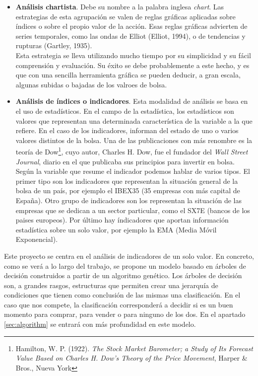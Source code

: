\begin{itemize}
    \item \textbf{An\'alisis chartista}. Debe su nombre a la palabra inglesa \textit{chart}. Las estrategias de esta agrupaci\'on se valen de reglas gr\'aficas aplicadas sobre \'indices o sobre el propio valor de la acci\'on. Esas reglas gr\'aficas advierten de series temporales, como las ondas de Elliot (Elliot, 1994), o de tendencias y rupturas (Gartley, 1935). \\
    
    Esta estrategia se lleva utilizando mucho tiempo por su simplicidad y su f\'acil comprensi\'on y evaluaci\'on.
    Su \'exito se debe probablemente a este hecho, y es que con una sencilla herramienta gr\'afica se pueden deducir, a gran escala, algunas subidas o bajadas de los valroes de bolsa.
    
    \item \textbf{An\'alisis de \'indices o indicadores}. Esta modalidad de an\'alisis se basa en el uso de estad\'isticos. En el campo de la estad\'istica, los estad\'isticos son valores que representan una determinada caracter\'istica de la variable a la que refiere. En el caso de los indicadores, informan del estado de uno o varios valores distintos de la bolsa. Una de las publicaciones con m\'as renombre es la teor\'ia de Dow\footnote{Hamilton, W. P. (1922). \textit{The Stock Market Barometer; a Study of Its Forecast Value Based on Charles H. Dow's Theory of the Price Movement}, Harper \& Bros., Nueva York}, cuyo autor, Charles H. Dow, fue el fundador del \textit{Wall Street Journal}, diario en el que publicaba sus principios para invertir en bolsa. \\
    
    Seg\'un la variable que resume el indicador podemos hablar de varios tipos. El primer tipo son los indicadores que representan la situaci\'on general de la bolsa de un pa\'is, por ejemplo el IBEX35 (35 empresas con m\'as capital de Espa\~na). Otro grupo de indicadores son los representan la situaci\'on de las empresas que se dedican a un sector particular, como el  SX7E (bancos de los paises europeos).
    Por \'ultimo hay \'indicadores que aportan informaci\'on estad\'istica sobre un solo valor, por ejemplo la EMA (Media M\'ovil Exponencial).
\end{itemize}

Este proyecto se centra en el an\'alisis de indicadores de un solo valor. En concreto, como se ver\'a a lo largo del trabajo, se propone un modelo basado en \'arboles de decisi\'on construidos a partir de un algoritmo gen\'etico. Los \'arboles de decisi\'on son, a grandes rasgos, estructuras que permiten crear una jerarqu\'ia de condiciones que tienen como conclusi\'on de las mismas una clasificaci\'on. En el caso que nos compete, la clasificaci\'on corresponder\'a a decidir si es un buen momento para comprar, para vender o para ninguno de los dos. En el apartado \ref{sec:algorithm} se entrar\'a con m\'as profundidad en este modelo. \\



